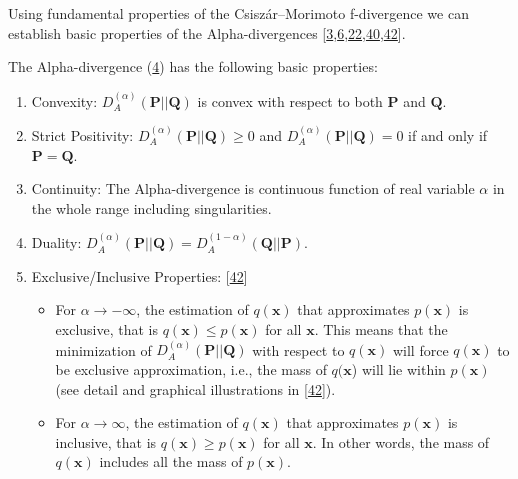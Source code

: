 Using fundamental properties of the Csiszár–Morimoto f-divergence we can establish basic properties of the Alpha-divergences [\hyperlink{B3-entropy-12-01532}{3},\allowbreak \hyperlink{B6-entropy-12-01532}{6},\allowbreak \hyperlink{B22-entropy-12-01532}{22},\allowbreak \hyperlink{B40-entropy-12-01532}{40},\allowbreak \hyperlink{B42-entropy-12-01532}{42}].


The Alpha-divergence (\hyperref[FD4-entropy-12-01532]{4}) has the following basic properties:

\begin{enumerate}
\item Convexity: \(D_{A}^{(\alpha)}{(\mathbf{P}||\mathbf{Q})}\) is convex with respect to both \(\mathbf{P}\) and \(\mathbf{Q}\).


\item Strict Positivity: \(D_{A}^{(\alpha)}{(\mathbf{P}||\mathbf{Q})} \geq 0\) and \(D_{A}^{(\alpha)}{(\mathbf{P}||\mathbf{Q})} = 0\) if and only if \(\mathbf{P} = \mathbf{Q}\).


\item Continuity: The Alpha-divergence is continuous function of real variable \(\alpha\) in the whole range including singularities.


\item Duality: \(D_{A}^{(\alpha)}{(\mathbf{P}||\mathbf{Q})} = D_{A}^{(1 - \alpha)}{(\mathbf{Q}||\mathbf{P})}\).


\item Exclusive/Inclusive Properties: [\hyperlink{B42-entropy-12-01532}{42}]

\begin{itemize}
\item For \(\left. \alpha\rightarrow - \infty \right.\), the estimation of \(q(\mathbf{x})\) that approximates \(p(\mathbf{x})\) is exclusive, that is \(q(\mathbf{x}) \leq p(\mathbf{x})\) for all \(\mathbf{x}\). This means that the minimization of \(D_{A}^{(\alpha)}{(\mathbf{P}||\mathbf{Q})}\) with respect to \(q(\mathbf{x})\) will force \(q(\mathbf{x})\) to be exclusive approximation, i.e., the mass of \(q(\mathbf{x}\)) will lie within \(p(\mathbf{x})\) (see detail and graphical illustrations in [\hyperlink{B42-entropy-12-01532}{42}]).


\item For \(\left. \alpha\rightarrow\infty \right.\), the estimation of \(q(\mathbf{x})\) that approximates \(p(\mathbf{x})\) is inclusive, that is \(q(\mathbf{x}) \geq p(\mathbf{x})\) for all \(\mathbf{x}\). In other words, the mass of \(q(\mathbf{x})\) includes all the mass of \(p(\mathbf{x})\).


\end{itemize}
\end{enumerate}
